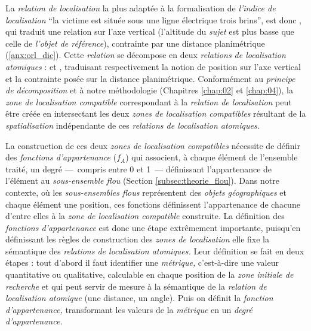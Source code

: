 La \emph{relation de localisation} la plus adaptée à la formalisation
de \emph{l'indice de localisation} \enquote{la victime est située sous
  une ligne électrique trois brins}, est donc
, qui traduit une relation sur l'axe
vertical (l'altitude du \emph{sujet} est plus basse que celle de
\emph{l'objet de référence}), contrainte par une distance
planimétrique (\autoref{anx:orl_dic}). Cette \emph{relation} se
décompose en deux \emph{relations de localisation atomiques} :
 et
, traduisant respectivement la notion de position
sur l'axe vertical et la contrainte posée sur la distance
planimétrique. Conformément au \emph{principe de décomposition} et à
notre méthodologie (Chapitres \ref{chap:02} et \ref{chap:04}), la
\emph{zone de localisation compatible} correspondant à la
\emph{relation de localisation}  peut
être créée en intersectant les deux \emph{zones de localisation
  compatibles} résultant de la \emph{spatialisation} indépendante de
ces \emph{relations de localisation atomiques.}

La construction de ces deux \emph{zones de localisation compatibles}
nécessite de définir des \emph{fonctions d'appartenance} ($f_A$) qui
associent, à chaque élément de l'ensemble traité, un degré ---~compris
entre 0 et 1~--- définissant l'appartenance de l'élément au
\emph{sous-ensemble flou} (Section \ref{subsec:theorie_flou}). Dans
notre contexte, où les \emph{sous-ensembles flous} représentent des
\emph{objets géographiques} et chaque élément une position, ces
fonctions définissent l'appartenance de chacune d'entre elles à la
\emph{zone de localisation compatible} construite. La définition des
\emph{fonctions d'appartenance} est donc une étape extrêmement
importante, puisqu'en définissant les règles de construction des
\emph{zones de localisation} elle fixe la sémantique des
\emph{relations de localisation atomiques.} Leur définition se fait en
deux étapes : tout d'abord il faut identifier une \emph{métrique,}
c'est-à-dire une valeur quantitative ou qualitative, calculable en
chaque position de la \emph{zone initiale de recherche} et qui peut
servir de mesure à la sémantique de la \emph{relation de localisation
  atomique} (\eg une distance, un angle). Puis on définit la
\emph{fonction d'appartenance,} transformant les valeurs de la
\emph{métrique} en un \emph{degré d'appartenance.}

